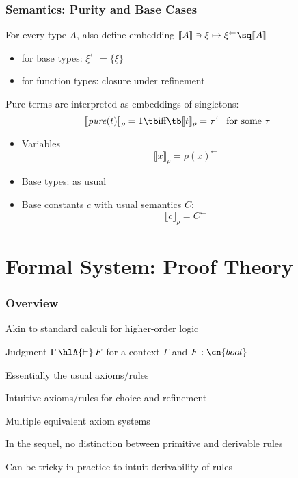 \documentclass{beamer}
\def\prop{\cn{bool}}
\def\pure#1{\mathit{pure}(#1)}
\def\der{\,\hlA{\vdash}\,}
\def\sem#1{\llbracket#1\rrbracket}
\def\seme#1#2{\llbracket#1\rrbracket_{#2}}
\def\semr#1{\seme{#1}{\rho}}
\def\rc#1{#1^\leftarrow}
\begin{document}
\begin{frame}\frametitle{Semantics: Purity and Base Cases}
For every type $A$, also define embedding $\sem{A}\ni \xi\mapsto \rc{\xi}\sq\sem{A}$
\begin{itemize}
 \item for base types: $\rc{\xi}=\{\xi\}$
 \item for function types: closure under refinement
\end{itemize}

Pure terms are interpreted as embeddings of singletons:
\[\semr{\pure{t}}=1 \tb\text{iff}\tb \semr{t}=\rc{\tau}\text{ for some } \tau\]

\begin{itemize}
\item Variables
\[\seme{x}{\rho} = \rc{\rho(x)}\]
\glec{note: $\rho(x)\in\sem{A}$, not $\rho(x)\sq\sem{A}$}
\item Base types: as usual
\item Base constants $c$ with usual semantics $C$:
  \[\semr{c}=\rc{C}\]
\end{itemize}
\end{frame}

\section{Formal System: Proof Theory}

\begin{frame}\frametitle{Overview}
\begin{blockitems}{Akin to standard calculi for higher-order logic}
\item Judgment $\Gamma\der F$ for a context $\Gamma$ and $F:\prop$
\item Essentially the usual axioms/rules
\item Intuitive axioms/rules for choice and refinement
\end{blockitems}

\begin{blockitems}{Multiple equivalent axiom systems}
\item In the sequel, no distinction between primitive and derivable rules
\item Can be tricky in practice to intuit derivability of rules
\end{blockitems}
\end{frame}
\end{document}
